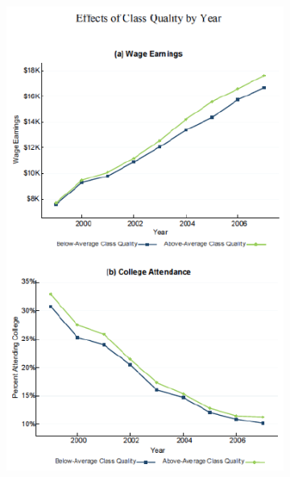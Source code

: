             \begin{figure}[H]
                 \centering
                 \begin{subfigure}[b]{0.4\textwidth}
                     \centering
                     \includegraphics[width=\textwidth]{images/ch9/9 chetty 2011 4.png}
                 \end{subfigure}
                 \begin{subfigure}[b]{0.4\textwidth}
                     \centering

\end{subfigure}
\end{figure}
